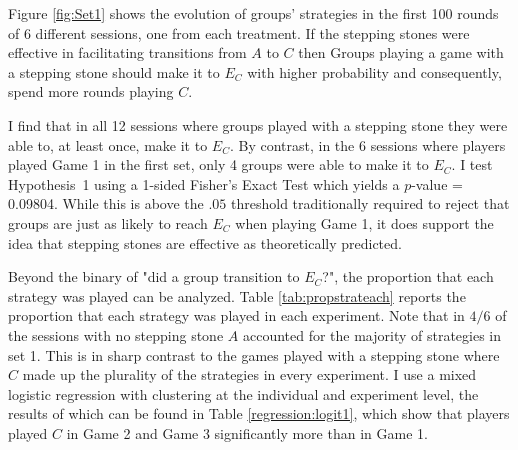 Figure \ref{fig:Set1} shows the evolution of groups' strategies in the first 100 rounds of 6 different sessions, one from each treatment. If the stepping stones were effective in facilitating transitions from $A$ to $C$ then Groups playing a game with a stepping stone should make it to $E_C$ with higher probability and  consequently, spend more rounds playing $C$.

I find that in all 12 sessions where groups played with a stepping stone they were able to, at least once, make it to $E_C$. By contrast, in the 6 sessions where players played Game 1 in the first set, only 4 groups were able to make it to $E_C$. I test Hypothesis~1 using a 1-sided Fisher's Exact Test which yields a $p$-value = 0.09804. While this is above the $.05$ threshold traditionally required to reject that groups are just as likely to reach $E_C$ when playing Game 1, it does support the idea that stepping stones are effective as theoretically predicted.   

Beyond the binary of "did a group transition to $E_C$?", the proportion that each strategy was played can be analyzed. Table \ref{tab:propstrateach} reports the proportion that each strategy was played in each experiment. Note that in $4/6$ of the sessions with no stepping stone $A$ accounted for the majority of strategies in set 1. This is in sharp contrast to the games played with a stepping stone where $C$ made up the plurality of the strategies in every experiment. I use a mixed logistic regression with clustering at the individual and experiment level, the results of which can be found in Table \ref{regression:logit1}, which show that players played $C$ in Game 2 and Game 3 significantly more than in Game 1. 

